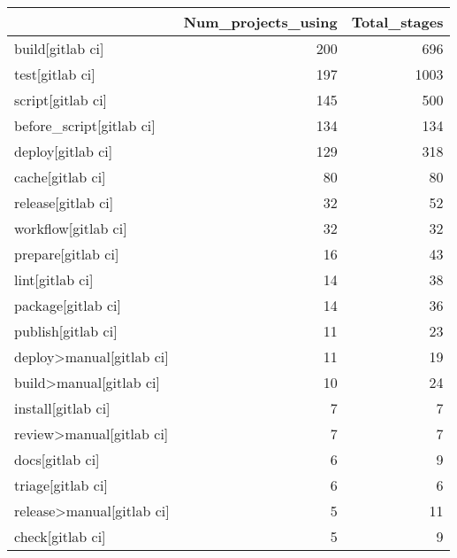 \begin{tabular}{lrr}
\toprule
{} &  Num\_projects\_using &  Total\_stages \\
\midrule
build[gitlab ci]                           &                 200 &           696 \\
test[gitlab ci]                            &                 197 &          1003 \\
script[gitlab ci]                          &                 145 &           500 \\
before\_script[gitlab ci]                   &                 134 &           134 \\
deploy[gitlab ci]                          &                 129 &           318 \\
cache[gitlab ci]                           &                  80 &            80 \\
release[gitlab ci]                         &                  32 &            52 \\
workflow[gitlab ci]                        &                  32 &            32 \\
prepare[gitlab ci]                         &                  16 &            43 \\
lint[gitlab ci]                            &                  14 &            38 \\
package[gitlab ci]                         &                  14 &            36 \\
publish[gitlab ci]                         &                  11 &            23 \\
deploy>manual[gitlab ci]                   &                  11 &            19 \\
build>manual[gitlab ci]                    &                  10 &            24 \\
install[gitlab ci]                         &                   7 &             7 \\
review>manual[gitlab ci]                   &                   7 &             7 \\
docs[gitlab ci]                            &                   6 &             9 \\
triage[gitlab ci]                          &                   6 &             6 \\
release>manual[gitlab ci]                  &                   5 &            11 \\
check[gitlab ci]                           &                   5 &             9 \\

\end{tabular}
